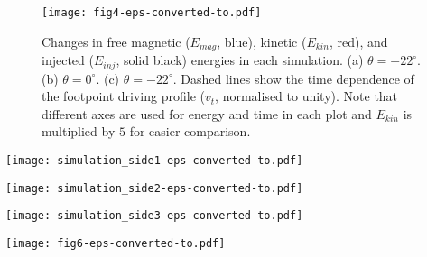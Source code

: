\documentclass[twocolumn]{aastex6}
\begin{document}
\begin{figure}
\centering
\texttt{[image: fig4-eps-converted-to.pdf]}
\caption{Changes in free magnetic ($E_{mag}$, blue), kinetic ($E_{kin}$, red), and injected ($E_{inj}$, solid black) energies in each simulation. (a) $\theta = +22^\circ$. (b) $\theta = 0^\circ$. (c) $\theta = -22^\circ$. Dashed lines show the time dependence of the footpoint driving profile ($v_{t}$, normalised to unity). Note that different axes are used for energy and time in each plot and $E_{kin}$ is multiplied by $5$ for easier comparison.}
\label{fig:energies}
\end{figure}

\begin{figure*}
\centering
\texttt{[image: simulation\_side1-eps-converted-to.pdf]}
\caption{The eruption sequence when $\theta = +22^\circ$. (a) $t = 16$ min, (b) $24$ min, and (c) $31$ min $20$ s. Shading shows electric current density ($|J|$) with the same colour scale as Figure \ref{fig:relax}. Red, cyan, and green field lines are traced from fixed, non-driven footpoints along the $y$-axis ($z=0$) on the photosphere. Yellow field lines that pass through the flux rope are traced from non-driven photospheric footpoints. An animation is available online.}
\label{fig:evolution1}
\end{figure*}

\begin{figure*}
\centering
\texttt{[image: simulation\_side2-eps-converted-to.pdf]}
\caption{The eruption sequence when $\theta = 0^\circ$. (a) $t = 22$ min $40$ s, (b) $45$ min $20$ s, and (c) $54$ min $40$ s. Shading and field lines as in Fig. \ref{fig:evolution1}. An animation is available online.}
\label{fig:evolution2}
\end{figure*}

\begin{figure*}
\centering
\texttt{[image: simulation\_side3-eps-converted-to.pdf]}
\caption{The eruption sequence when $\theta = -22^\circ$. (a) $t = 23$ min $20$ s, (b) $30$ min $40$ s, and (c) $40$ min. Shading and field lines as in Fig. \ref{fig:evolution1}. An animation is available online.}
\label{fig:evolution3}
\end{figure*}

\begin{figure*}
\centering
\texttt{[image: fig6-eps-converted-to.pdf]}
\caption{End-on (top row) and side (bottom row) views of the shift of the interchanging current layer as the flux rope opens for $\theta = +22^\circ$. White iso-surfaces show $|J| = 1.0$ ($\times \,1.5\times10^{-3} \text{A} \,\text{m}^{-2}$ with coronal scalings). Field lines as in Figure \ref{fig:evolution1}.  Left column: $t = 27$ min $20$ s. Middle column: $t = 29$ min $20$ s. Right column: $t = 31$ min $20$ s. BCS = breakout current sheet. FCS = flare current sheet. NP  = null point.}
\label{fig:opening}
\end{figure*}
\end{document}
